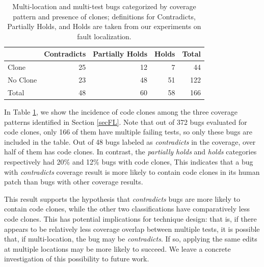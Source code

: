 \documentclass[10pt, conference]{IEEEtran}
\begin{document}

\begin{table}
  {\begin{center}
      \begin{tabular} {lrrrr}
        \toprule
        & Contradicts & Partially Holds & Holds & Total \\
        \midrule
        Clone & 25 & 12 &  7 &  44 \\
        No Clone  & 23 & 48 & 51 & 122 \\
        \midrule
        Total     & 48 & 60 & 58 & 166 \\
        \bottomrule
      \end{tabular}
    \end{center}
  }
  \caption{Multi-location and multi-test bugs categorized by coverage pattern
    and presence of clones; definitions for Contradicts, Partially Holds, and
    Holds are taken from our experiments on fault localization.}
  \label{tab:cov_clones}
\end{table}

In Table \ref{tab:cov_clones}, we show the incidence of code clones among the three 
coverage patterns identified in Section \ref{secFL}. Note that out of 372 bugs evaluated for code clones, only 166 of them have multiple failing tests, so only these bugs are included in the table.  Out of 48 bugs labeled as 
\emph{contradicts} in the coverage, over half of them has code clones. In contrast, the 
\emph{partially holds} and \emph{holds} categories respectively had 20\% and 12\% bugs with code clones, 
This indicates that a 
bug with \emph{contradicts} coverage result is more likely to contain code clones in its
human patch than bugs with other coverage results. 

This result supports the hypothesis that \emph{contradicts} bugs are more likely to contain 
code clones, while the other two classifications have comparatively less code
clones. This has potential implications for technique design: that is, if there
appears to be relatively less coverage overlap between multiple tests, it is
possible that, if multi-location, the bug may be \emph{contradicts}.  If so,
applying the same edits at multiple locations may be more likely to succeed.  We
leave a concrete investigation of this possibility to future work.
\end{document}
